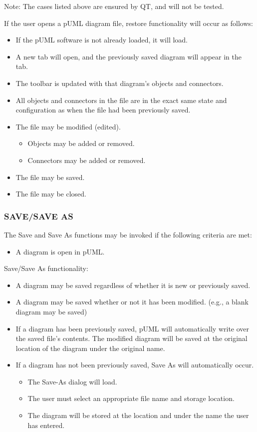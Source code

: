 \documentclass[twoside,letterpaper]{article}
\begin{document}
{\bigskip

Note: The cases listed above are ensured by QT, and will not be tested.
\newline 


If the user opens a pUML diagram file, restore functionality will occur as follows:
\begin{itemize}
\item If the pUML software is not already loaded, it will load.
\item A new tab will open, and the previously saved diagram will appear in the tab.
\item The toolbar is updated with that diagram's objects and connectors.
\item All objects and connectors in the file are in the exact same state and configuration as when the file had been previously saved.
\item The file may be modified (edited).
\begin{itemize}
\item Objects may be added or removed.
\item Connectors may be added or removed.
\end{itemize}
\item The file may be saved.
\item The file may be closed.
\end{itemize}

\bigskip

\subsubsection[SAVE]{\bfseries SAVE/SAVE AS}
{
The Save and Save As functions may be invoked if the following criteria are met: 
\begin{itemize}
\item A diagram is open in pUML.
\end{itemize}
}

\bigskip

Save/Save As functionality:
\newline
{
\begin{itemize}
\item A diagram may be saved regardless of whether it is new or previously saved.
\item A diagram may be saved whether or not it has been modified. (e.g., a blank diagram may be saved)
\item If a diagram has been previously saved, pUML will automatically write over the saved file's contents. The modified diagram will be saved at the original location of the diagram under the original name.
\item If a diagram has not been previously saved, Save As will automatically occur.
\begin{itemize}
\item The Save-As dialog will load.
\item The user must select an appropriate file name and storage location. 
\item The diagram will be stored at the location and under the name the user has entered.
\end{itemize}
\end{itemize}
}

}
\end{document}
